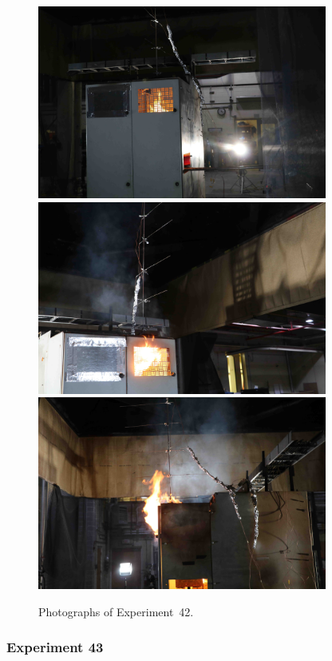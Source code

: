 \begin{figure}[p]
\centering
\includegraphics[height=2.50in]{../FIGURES/Test_42_start} \\
\includegraphics[height=2.50in]{../FIGURES/Test_42_rear} \\
\includegraphics[height=2.50in]{../FIGURES/Test_42_side}
\caption[Photographs of Experiment~42]{Photographs of Experiment~42.}
\label{fig:Test_42_photos}
\end{figure}


\clearpage

\subsubsection{Experiment 43}

